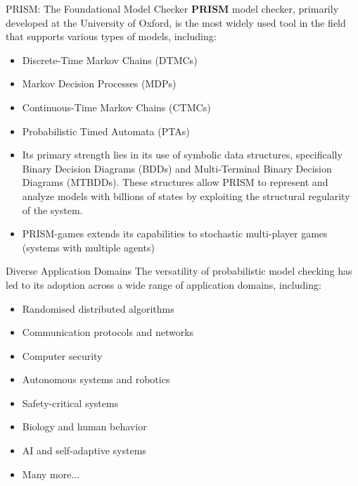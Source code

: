 \documentclass[dvipsnames]{beamer}
\begin{document}
\begin{frame}{PRISM: The Foundational Model Checker}
    \textbf{PRISM} model checker, primarily developed at the University of Oxford,
    is the most widely used tool in the field that supports various types of models, including:
    \begin{itemize}
        \item Discrete-Time Markov Chains (DTMCs)
        \item Markov Decision Processes (MDPs)
        \item Continuous-Time Markov Chains (CTMCs)
        \item Probabilistic Timed Automata (PTAs)
    \end{itemize}
\end{frame}
\begin{frame}
    \begin{itemize}
        \item     Its primary strength lies in its use of symbolic data structures,
              specifically Binary Decision Diagrams (BDDs) and Multi-Terminal Binary
              Decision Diagrams (MTBDDs).
              These structures allow PRISM to represent and analyze models
              with billions of states by exploiting the structural regularity
              of the system.
        \item  PRISM-games extends its capabilities to stochastic multi-player games (systems with multiple agents)
    \end{itemize}




\end{frame}


\begin{frame}{Diverse Application Domains}
    The versatility of probabilistic model checking has led to its adoption across
    a wide range of application domains, including:
    \begin{itemize}
        \item Randomised distributed algorithms
        \item Communication protocols and networks
        \item Computer security
        \item Autonomous systems and robotics
        \item Safety-critical systems
        \item Biology and human behavior
        \item AI and self-adaptive systems
        \item Many more...
    \end{itemize}
\end{frame}
\end{document}
